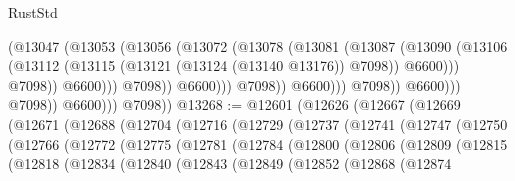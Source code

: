 \begin{lexlean}{RustStd}
\begin{coremodule}
                                            (@13047
                                              (@13053
                                                (@13056
                                                  (@13072
                                                    (@13078
                                                      (@13081
                                                        (@13087
                                                          (@13090
                                                            (@13106
                                                              (@13112
                                                                (@13115
                                                                  (@13121
                                                                    (@13124 (@13140 @13176))
                                                                    @7098))
                                                                @6600)))
                                                          @7098))
                                                      @6600)))
                                                @7098))
                                            @6600)))
                                      @7098))
                                  @6600)))
                            @7098))
                        @6600)))
                  @7098))
              @6600)))
        @7098))
@13268 := @12601
    (@12626
      (@12667
        (@12669
          (@12671
            (@12688
              (@12704
                (@12716
                  (@12729
                    (@12737
                      (@12741
                        (@12747
                          (@12750
                            (@12766
                              (@12772
                                (@12775
                                  (@12781
                                    (@12784
                                      (@12800
                                        (@12806
                                          (@12809
                                            (@12815
                                              (@12818
                                                (@12834
                                                  (@12840
                                                    (@12843
                                                      (@12849
                                                        (@12852
                                                          (@12868
                                                            (@12874

\end{coremodule}
\end{lexlean}
